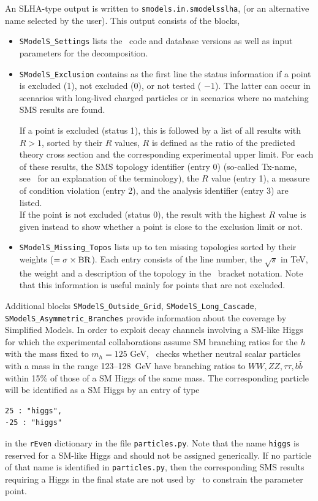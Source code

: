 \documentclass[12pt,a4paper]{article}
\begin{document}
An SLHA-type output  is written to {\tt smodels.in.smodelsslha},
(or an alternative name selected by the user).
This output consists of the blocks, 
\begin{itemize}
\item {\tt SModelS\_Settings} lists the \smodels\ code and database versions as well as input parameters for the decomposition. 
\item {\tt SModelS\_Exclusion} 
contains as the first line the status information if a point is excluded (1), not excluded (0),  or not tested ( $-1$). 
The latter can occur in scenarios with long-lived charged particles or in scenarios where no matching SMS results are found. 

If a point is excluded (status 1), this is followed by a list of all results with $R>1$, sorted by their $R$ values,  $R$ is defined as the ratio of the predicted theory cross section and the corresponding experimental upper limit.
For each of these results, the SMS topology identifier (entry 0) (so-called Tx-name, see~\cite{SMS_dictionary} for an explanation of the terminology), 
the $R$ value (entry 1), a measure of condition violation (entry 2), and the analysis identifier (entry 3) are listed.\\
If the point is not excluded (status 0), the result with the highest $R$ value is given instead to show whether a point is close to the exclusion limit or not. 


\item {\tt SModelS\_Missing\_Topos} lists up to ten missing topologies sorted by their weights ($ = \sigma\times {\rm BR}$).  Each entry consists of the line number, the $\sqrt{s}$ in TeV, the weight and a description of the topology in the \smodels\ bracket notation. Note that this information is useful mainly for points that are not excluded.
 
\end{itemize}
  
Additional blocks  {\tt SModelS\_Outside\_Grid}, {\tt SModelS\_Long\_Cascade},\\
 {\tt SModelS\_Asymmetric\_Branches}  provide  information about the coverage by Simplified Models.
In order to  exploit decay channels involving a SM-like Higgs for which the experimental collaborations assume  
SM branching ratios for the $h$ with the mass fixed to $m_h=125$ GeV, \micro\ checks whether  
neutral scalar particles with a mass in the range 123--128~GeV have branching ratios to $WW,ZZ,\tau\tau, b\bar{b}$ within 15\% of those of a SM Higgs of the same mass. 
The corresponding particle will be identified as a SM Higgs 
by an entry of type
\begin{verbatim}
25 : "higgs",
-25 : "higgs"
\end{verbatim}
in the {\tt rEven} dictionary in the file {\tt particles.py}.    
Note that the name {\tt higgs} is reserved for a SM-like Higgs and should not be assigned generically. 
If no particle of that name is identified in {\tt particles.py},  then the corresponding SMS results requiring a Higgs in the final state are not used by \smodels\ to constrain the parameter point.
\end{document}
